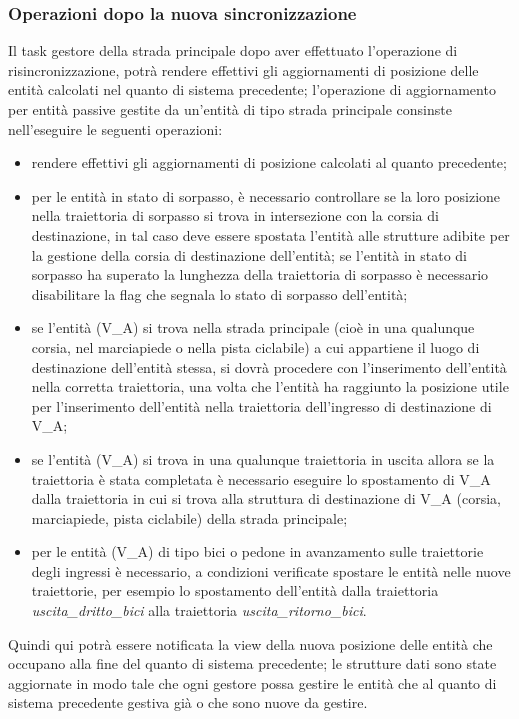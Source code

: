 \subsubsection*{Operazioni dopo la nuova sincronizzazione} 
Il task gestore della strada principale dopo aver effettuato l'operazione di risincronizzazione, potrà rendere effettivi gli aggiornamenti di posizione delle entità calcolati nel quanto di sistema precedente; l'operazione di aggiornamento per entità passive gestite da un'entità di tipo strada principale consinste nell'eseguire le seguenti operazioni:
\begin{itemize}
\item rendere effettivi gli aggiornamenti di posizione calcolati al quanto precedente;
\item per le entità in stato di sorpasso, è necessario controllare se la loro posizione nella traiettoria di sorpasso si trova in intersezione con la corsia di destinazione, in tal caso deve essere spostata l'entità alle strutture adibite per la gestione della corsia di destinazione dell'entità; se l'entità in stato di sorpasso ha superato la lunghezza della traiettoria di sorpasso è necessario disabilitare la flag che segnala lo stato di sorpasso dell'entità;
\item se l'entità (V\_A) si trova nella strada principale (cioè in una qualunque corsia, nel marciapiede o nella pista ciclabile) a cui appartiene il luogo di destinazione dell'entità stessa, si dovrà procedere con l'inserimento dell'entità nella corretta traiettoria, una volta che l'entità ha raggiunto la posizione utile per l'inserimento dell'entità nella traiettoria dell'ingresso di destinazione di V\_A;
\item se l'entità (V\_A) si trova in una qualunque traiettoria in uscita allora se la traiettoria è stata completata è necessario eseguire lo spostamento di V\_A dalla traiettoria in cui si trova alla struttura di destinazione di V\_A (corsia, marciapiede, pista ciclabile) della strada principale;
\item per le entità (V\_A) di tipo bici o pedone in avanzamento sulle traiettorie degli ingressi è necessario, a condizioni verificate spostare le entità nelle nuove traiettorie, per esempio lo spostamento dell'entità dalla traiettoria \textit{usci\-ta\_drit\-to\_bi\-ci} alla traiettoria \textit{usci\-ta\_ri\-tor\-no\_bi\-ci}.  
\end{itemize}
Quindi qui potrà essere notificata la view della nuova posizione delle entità che occupano alla fine del quanto di sistema precedente; le strutture dati sono state aggiornate in modo tale che ogni gestore possa gestire le entità che al quanto di sistema precedente gestiva già o che sono nuove da gestire.  

